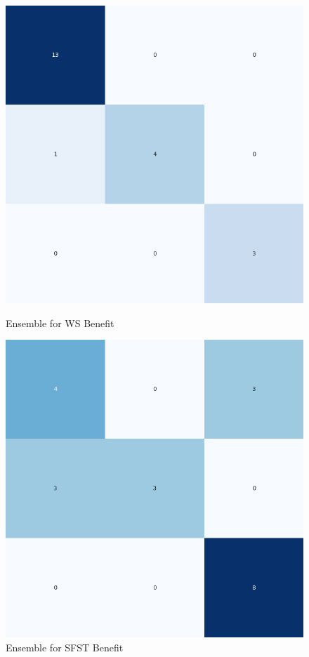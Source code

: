 \begin{figure}[H]
    \centering
    \begin{minipage}[b]{0.45\textwidth}
        \includegraphics[width=\textwidth]{./class_specific_section/ensemble_plots/ensemble_confusion_matrix_WS_Benefit.png}
        \caption{Ensemble for WS Benefit}
        \label{fig_class:spec_ensemble_ws_benefit}
    \end{minipage}
    \hfill
    \begin{minipage}[b]{0.45\textwidth}
        \includegraphics[width=\textwidth]{./class_specific_section/ensemble_plots/ensemble_confusion_matrix_SFST_Benefit.png}
        \caption{Ensemble for SFST Benefit}
        \label{fig_class:spec_ensemble_sfst_benefit}
    \end{minipage}
\end{figure}